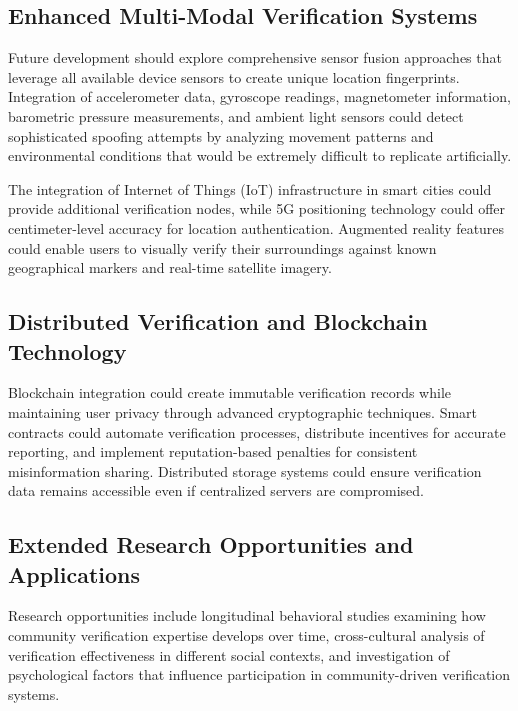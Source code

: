 \subsection{Enhanced Multi-Modal Verification Systems}
\label{subsec:multimodal_verification}

Future development should explore comprehensive sensor fusion approaches that leverage all available device sensors to create unique location fingerprints. Integration of accelerometer data, gyroscope readings, magnetometer information, barometric pressure measurements, and ambient light sensors could detect sophisticated spoofing attempts by analyzing movement patterns and environmental conditions that would be extremely difficult to replicate artificially.

The integration of Internet of Things (IoT) infrastructure in smart cities could provide additional verification nodes, while 5G positioning technology could offer centimeter-level accuracy for location authentication. Augmented reality features could enable users to visually verify their surroundings against known geographical markers and real-time satellite imagery.

\subsection{Distributed Verification and Blockchain Technology}
\label{subsec:distributed_verification}

Blockchain integration could create immutable verification records while maintaining user privacy through advanced cryptographic techniques. Smart contracts could automate verification processes, distribute incentives for accurate reporting, and implement reputation-based penalties for consistent misinformation sharing. Distributed storage systems could ensure verification data remains accessible even if centralized servers are compromised.

\subsection{Extended Research Opportunities and Applications}
\label{subsec:extended_research}

Research opportunities include longitudinal behavioral studies examining how community verification expertise develops over time, cross-cultural analysis of verification effectiveness in different social contexts, and investigation of psychological factors that influence participation in community-driven verification systems.

